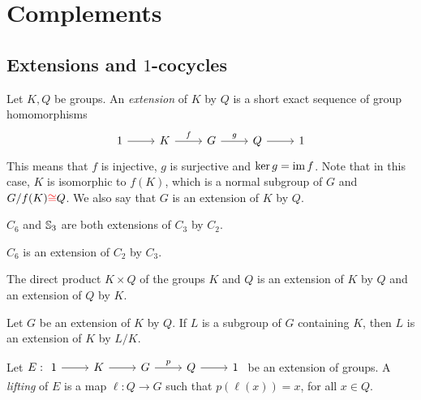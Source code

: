 \chapter{Complements}
\label{cocycles}

\section{Extensions and $1$-cocycles}


Let $K,Q$ be groups.
An {\em extension} of $K$ by $Q$ is a
short exact sequence of group homomorphisms 
\[
\begin{tikzcd}
	1 & K & G & Q & 1
	\arrow[from=1-1, to=1-2]
	\arrow["f", from=1-2, to=1-3]
	\arrow["g", from=1-3, to=1-4]
	\arrow[from=1-4, to=1-5]
\end{tikzcd}
\]
This means that $f$ is injective, $g$ is surjective and $\ker g=\operatorname{im} f$. Note that in this case, 
$K$ is isomorphic to $f(K)$, which is a normal subgroup of $G$ and $G/f(K)\textcolor{red}{\cong} Q$. We also say that $G$ is an extension of $K$ by $Q$.

\begin{example}
	$C_6$ and $\mathbb{S}_3$ are both extensions of $C_3$ by $C_2$.
\end{example}

\begin{example}
	$C_6$ is an extension of $C_2$ by $C_3$.
\end{example}

\begin{example}
    The direct product $K\times Q$ of the groups $K$ and $Q$ 
    is an extension of $K$ by $Q$ and an extension of $Q$ by $K$. 
\end{example}

\begin{example}
Let $G$ be an extension of $K$ by $Q$. If $L$ is a subgroup of $G$ containing $K$, 
then $L$ is an extension
of $K$ by $L/K$.
\end{example}

Let $E:
\begin{tikzcd}
	1 & K & G & Q & 1
	\arrow[from=1-1, to=1-2]
	\arrow[from=1-2, to=1-3]
	\arrow["p", from=1-3, to=1-4]
	\arrow[from=1-4, to=1-5]
\end{tikzcd}$
be an extension of groups. A {\em lifting} of $E$ is a map $\ell\colon
Q\to G$ such that $p(\ell(x))=x$, for all $x\in Q$. 


